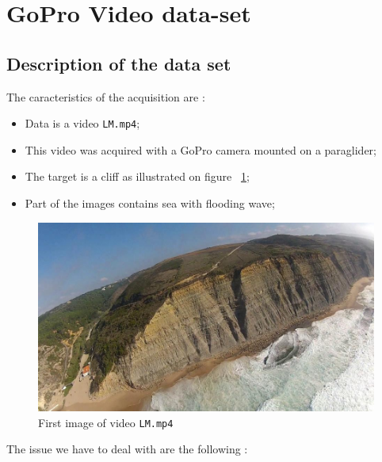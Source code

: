 \section{GoPro Video data-set}

\subsection{Description of the data set}\label{GoProVideo:DataSet}

The caracteristics of the acquisition are :

\begin{itemize}
   \item Data is a video {\tt LM.mp4};
   \item This video was acquired with a GoPro camera mounted on a paraglider;
   \item The target is a cliff as illustrated on figure ~\ref{fig:GoProIm1};
   \item Part of the images contains sea with flooding wave;
\end{itemize}

\begin{figure}
\centering
\includegraphics[width=0.8\linewidth]{FIGS/GoProVideo/Im1Ok.jpg}
\caption{First image of video  {\tt LM.mp4}}
\label{fig:GoProIm1}
\end{figure}


The issue we have to deal with are the following :

